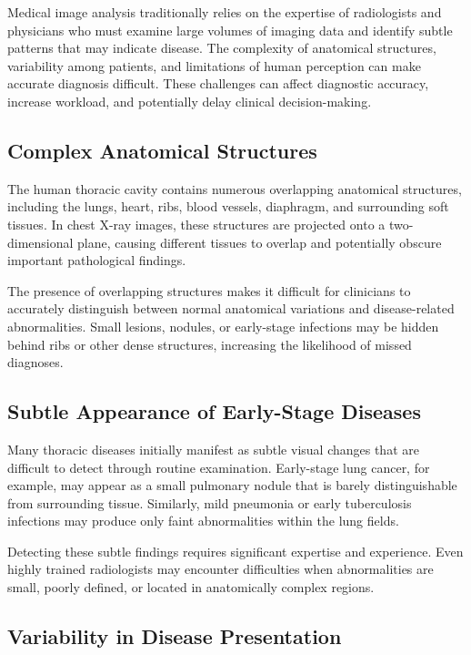 Medical image analysis traditionally relies on the expertise of radiologists and physicians who must examine large volumes of imaging data and identify subtle patterns that may indicate disease. The complexity of anatomical structures, variability among patients, and limitations of human perception can make accurate diagnosis difficult. These challenges can affect diagnostic accuracy, increase workload, and potentially delay clinical decision-making.

\subsection{Complex Anatomical Structures}

The human thoracic cavity contains numerous overlapping anatomical structures, including the lungs, heart, ribs, blood vessels, diaphragm, and surrounding soft tissues. In chest X-ray images, these structures are projected onto a two-dimensional plane, causing different tissues to overlap and potentially obscure important pathological findings.

The presence of overlapping structures makes it difficult for clinicians to accurately distinguish between normal anatomical variations and disease-related abnormalities. Small lesions, nodules, or early-stage infections may be hidden behind ribs or other dense structures, increasing the likelihood of missed diagnoses.

\subsection{Subtle Appearance of Early-Stage Diseases}

Many thoracic diseases initially manifest as subtle visual changes that are difficult to detect through routine examination. Early-stage lung cancer, for example, may appear as a small pulmonary nodule that is barely distinguishable from surrounding tissue. Similarly, mild pneumonia or early tuberculosis infections may produce only faint abnormalities within the lung fields.

Detecting these subtle findings requires significant expertise and experience. Even highly trained radiologists may encounter difficulties when abnormalities are small, poorly defined, or located in anatomically complex regions.

\subsection{Variability in Disease Presentation}

